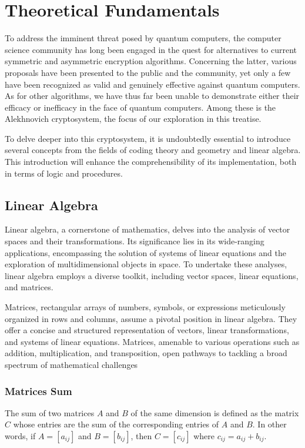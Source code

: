 \chapter{Theoretical Fundamentals}

To address the imminent threat posed by quantum computers, the computer science community has long been engaged in the quest for alternatives to current symmetric and asymmetric encryption algorithms. Concerning the latter, various proposals have been presented to the public and the community, yet only a few have been recognized as valid and genuinely effective against quantum computers. As for other algorithms, we have thus far been unable to demonstrate either their efficacy or inefficacy in the face of quantum computers. Among these is the Alekhnovich cryptosystem, the focus of our exploration in this treatise.

To delve deeper into this cryptosystem, it is undoubtedly essential to introduce several concepts from the fields of coding theory and geometry and linear algebra. This introduction will enhance the comprehensibility of its implementation, both in terms of logic and procedures.

\section{Linear Algebra}
Linear algebra, a cornerstone of mathematics, delves into the analysis of vector spaces and their transformations. Its significance lies in its wide-ranging applications, encompassing the solution of systems of linear equations and the exploration of multidimensional objects in space. To undertake these analyses, linear algebra employs a diverse toolkit, including vector spaces, linear equations, and matrices.

Matrices, rectangular arrays of numbers, symbols, or expressions meticulously organized in rows and columns, assume a pivotal position in linear algebra. They offer a concise and structured representation of vectors, linear transformations, and systems of linear equations. Matrices, amenable to various operations such as addition, multiplication, and transposition, open pathways to tackling a broad spectrum of mathematical challenges

\subsection{Matrices Sum}
The sum of two matrices $A$ and $B$ of the same dimension is defined as the matrix $C$ whose entries are the sum of the corresponding entries of $A$ and $B$. In other words, if $A = [a_{ij}]$ and $B = [b_{ij}]$, then $C = [c_{ij}]$ where $c_{ij} = a_{ij} + b_{ij}$.

